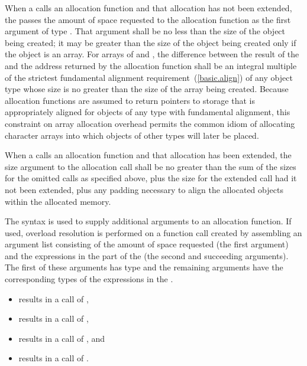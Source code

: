 \pnum
When a  calls an allocation function and that
allocation has not been extended, the
 passes the amount of space requested to the
allocation function as the first argument of type
. That argument shall be no less than the size
of the object being created; it may be greater than the size of the
object being created only if the object is an array. For arrays of
 and , the difference between the
result of the  and the address returned by the
allocation function shall be an integral multiple of the
strictest fundamental
alignment requirement~(\ref{basic.align}) of any object type whose size
is no greater than the size of the array being created.
\enternote 
{}%
Because allocation functions are assumed to return pointers to storage
that is appropriately aligned for objects of any type
with fundamental alignment, this constraint
on array allocation overhead permits the common idiom of allocating
character arrays into which objects of other types will later be placed.
\exitnote 

\pnum
When a  calls an allocation function and that
allocation has been extended, the size argument to the allocation call shall
be no greater than the sum of the sizes for the omitted calls as specified
above, plus the size for the extended call had it not been extended, plus any
padding necessary to align the allocated objects within the allocated memory.



\pnum
{}%
The  syntax is used to supply additional
arguments to an allocation function. If used, overload resolution is
performed on a function call created by assembling an argument list
consisting of the amount of space requested (the first argument) and the
expressions in the  part of the
 (the second and succeeding arguments). The
first of these arguments has type  and the remaining
arguments have the corresponding types of the expressions in the
.

\pnum
\enterexample 

\begin{itemize}
\item {} results in a call of ,

\item {} results in a call of ,

\item {} results in a call of , and

\item {} results in a call of .
\end{itemize}

